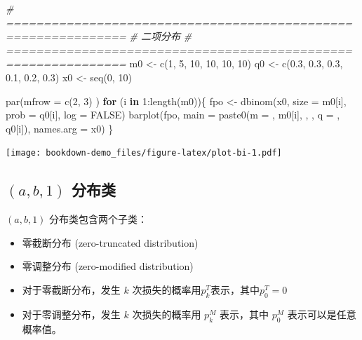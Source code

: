 \documentclass[
]{book}
\newenvironment{Shaded}{\begin{snugshade}}{\end{snugshade}}
\newcommand{\AttributeTok}[1]{\textcolor[rgb]{0.77,0.63,0.00}{#1}}
\newcommand{\CommentTok}[1]{\textcolor[rgb]{0.56,0.35,0.01}{\textit{#1}}}
\newcommand{\ConstantTok}[1]{\textcolor[rgb]{0.00,0.00,0.00}{#1}}
\newcommand{\ControlFlowTok}[1]{\textcolor[rgb]{0.13,0.29,0.53}{\textbf{#1}}}
\newcommand{\DecValTok}[1]{\textcolor[rgb]{0.00,0.00,0.81}{#1}}
\newcommand{\FloatTok}[1]{\textcolor[rgb]{0.00,0.00,0.81}{#1}}
\newcommand{\FunctionTok}[1]{\textcolor[rgb]{0.00,0.00,0.00}{#1}}
\newcommand{\NormalTok}[1]{#1}
\newcommand{\OtherTok}[1]{\textcolor[rgb]{0.56,0.35,0.01}{#1}}
\newcommand{\SpecialCharTok}[1]{\textcolor[rgb]{0.00,0.00,0.00}{#1}}
\newcommand{\StringTok}[1]{\textcolor[rgb]{0.31,0.60,0.02}{#1}}
\begin{document}
\begin{Shaded}
\begin{Highlighting}[]
\CommentTok{\# ==============================================================}
\CommentTok{\# 二项分布}
\CommentTok{\# ==============================================================}
\NormalTok{m0 }\OtherTok{\textless{}{-}} \FunctionTok{c}\NormalTok{(}\DecValTok{1}\NormalTok{, }\DecValTok{5}\NormalTok{, }\DecValTok{10}\NormalTok{, }\DecValTok{10}\NormalTok{, }\DecValTok{10}\NormalTok{, }\DecValTok{10}\NormalTok{)}
\NormalTok{q0 }\OtherTok{\textless{}{-}} \FunctionTok{c}\NormalTok{(}\FloatTok{0.3}\NormalTok{, }\FloatTok{0.3}\NormalTok{, }\FloatTok{0.3}\NormalTok{, }\FloatTok{0.1}\NormalTok{, }\FloatTok{0.2}\NormalTok{, }\FloatTok{0.3}\NormalTok{)}
\NormalTok{x0 }\OtherTok{\textless{}{-}} \FunctionTok{seq}\NormalTok{(}\DecValTok{0}\NormalTok{, }\DecValTok{10}\NormalTok{)}

\FunctionTok{par}\NormalTok{(}\AttributeTok{mfrow =} \FunctionTok{c}\NormalTok{(}\DecValTok{2}\NormalTok{, }\DecValTok{3}\NormalTok{) )}
\ControlFlowTok{for}\NormalTok{ (i }\ControlFlowTok{in} \DecValTok{1}\SpecialCharTok{:}\FunctionTok{length}\NormalTok{(m0))\{}
\NormalTok{  fpo }\OtherTok{\textless{}{-}} \FunctionTok{dbinom}\NormalTok{(x0, }\AttributeTok{size =}\NormalTok{ m0[i], }\AttributeTok{prob =}\NormalTok{ q0[i], }\AttributeTok{log =} \ConstantTok{FALSE}\NormalTok{)}
  \FunctionTok{barplot}\NormalTok{(fpo, }
          \AttributeTok{main =} \FunctionTok{paste0}\NormalTok{(}\StringTok{\textquotesingle{}m = \textquotesingle{}}\NormalTok{, m0[i], }\StringTok{\textquotesingle{},  \textquotesingle{}}\NormalTok{,}
                        \StringTok{\textquotesingle{}q = \textquotesingle{}}\NormalTok{, q0[i]),}
          \AttributeTok{names.arg =}\NormalTok{ x0)}
\NormalTok{\}}
\end{Highlighting}
\end{Shaded}

\texttt{[image: bookdown-demo\_files/figure-latex/plot-bi-1.pdf]}

\hypertarget{ab1-ux5206ux5e03ux7c7b}{%
\subsection{\texorpdfstring{\((a,b,1)\) 分布类}{(a,b,1) 分布类}}\label{ab1-ux5206ux5e03ux7c7b}}

\((a,b,1)\) 分布类包含两个子类：

\begin{itemize}
\item
  零截断分布 (zero-truncated distribution)
\item
  零调整分布 (zero-modified distribution)
\item
  对于零截断分布，发生 \(k\) 次损失的概率用\(p_k^T\)表示，其中\(p_0^T=0\)
\item
  对于零调整分布，发生 \(k\) 次损失的概率用 \(p_k^M\) 表示，其中 \(p_0^M\) 表示可以是任意概率值。
\end{itemize}
\end{document}
